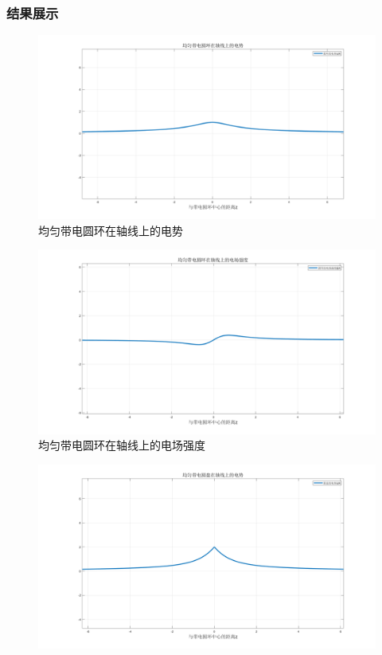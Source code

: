 \documentclass[UTF8]{article}
\numberwithin{figure}{subsection}
\numberwithin{table}{subsection}
\begin{document}
\begin{multicols}{2}
    \subsubsection{结果展示}
    \begin{figure}[H]
    	\centering
    	\includegraphics[scale=0.15]{圆环电势.png}
    	\caption{均匀带电圆环在轴线上的电势}
    \end{figure}
	\begin{figure}[H]
		\centering
		\includegraphics[scale=0.15]{圆环场强.png}
		\caption{均匀带电圆环在轴线上的电场强度}
	\end{figure}
	\begin{figure}[H]
		\centering
		\includegraphics[scale=0.15]{圆盘电势.png}

\end{figure}
\end{multicols}
\end{document}
